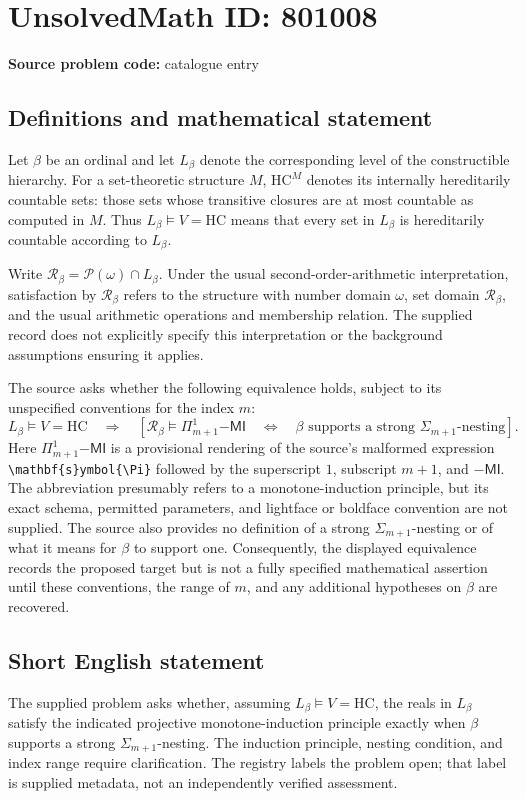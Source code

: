 \documentclass[11pt]{article}
\begin{document}
\section*{UnsolvedMath ID: 801008}
\textbf{Source problem code:} catalogue entry
\subsection{Definitions and mathematical statement}
Let \(\beta\) be an ordinal and let \(L_\beta\) denote the corresponding level of the constructible hierarchy. For a set-theoretic structure \(M\), \(\mathrm{HC}^{M}\) denotes its internally hereditarily countable sets: those sets whose transitive closures are at most countable as computed in \(M\). Thus \(L_\beta\models V=\mathrm{HC}\) means that every set in \(L_\beta\) is hereditarily countable according to \(L_\beta\).

Write \(\mathcal R_\beta=\mathcal P(\omega)\cap L_\beta\). Under the usual second-order-arithmetic interpretation, satisfaction by \(\mathcal R_\beta\) refers to the structure with number domain \(\omega\), set domain \(\mathcal R_\beta\), and the usual arithmetic operations and membership relation. The supplied record does not explicitly specify this interpretation or the background assumptions ensuring it applies.

The source asks whether the following equivalence holds, subject to its unspecified conventions for the index \(m\):
\[
L_\beta\models V=\mathrm{HC}
\quad\Longrightarrow\quad
\left[
\mathcal R_\beta\models\Pi^1_{m+1}\mathsf{-MI}
\quad\Longleftrightarrow\quad
\beta\text{ supports a strong }\Sigma_{m+1}\text{-nesting}
\right].
\]
Here \(\Pi^1_{m+1}\mathsf{-MI}\) is a provisional rendering of the source's malformed expression \texttt{\textbackslash mathbf\{s\}ymbol\{\textbackslash Pi\}} followed by the superscript \(1\), subscript \(m+1\), and \(\mathsf{-MI}\). The abbreviation presumably refers to a monotone-induction principle, but its exact schema, permitted parameters, and lightface or boldface convention are not supplied. The source also provides no definition of a strong \(\Sigma_{m+1}\)-nesting or of what it means for \(\beta\) to support one. Consequently, the displayed equivalence records the proposed target but is not a fully specified mathematical assertion until these conventions, the range of \(m\), and any additional hypotheses on \(\beta\) are recovered.
\subsection{Short English statement}
The supplied problem asks whether, assuming \(L_\beta\models V=\mathrm{HC}\), the reals in \(L_\beta\) satisfy the indicated projective monotone-induction principle exactly when \(\beta\) supports a strong \(\Sigma_{m+1}\)-nesting. The induction principle, nesting condition, and index range require clarification. The registry labels the problem open; that label is supplied metadata, not an independently verified assessment.
\end{document}

